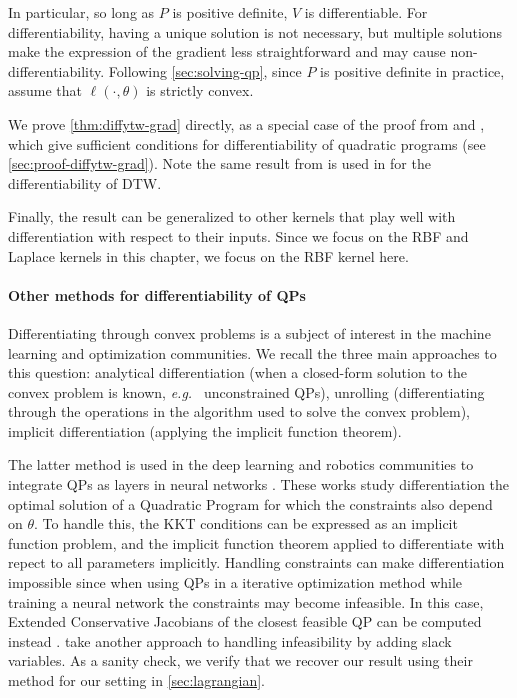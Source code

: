 In particular, so long as $P$ is positive definite, $V$ is differentiable. For differentiability, having a unique solution is not necessary, but multiple solutions make the expression of the gradient less straightforward and may cause non-differentiability. Following \cref{sec:solving-qp}, since $P$ is positive definite in practice, assume that $\ell(\cdot, \theta)$ is strictly convex.

We prove \cref{thm:diffytw-grad} directly, as a special case of the proof from \cite{shapiro} and \cite{lee}, which give sufficient conditions for differentiability of quadratic programs (see \cref{sec:proof-diffytw-grad}). Note the same result from \citep{shapiro} is used in \cite{tavenard-dtw-diff} for the differentiability of DTW.

Finally, the result can be generalized to other kernels that play well with differentiation with respect to their inputs. Since we focus on the RBF and Laplace kernels in this chapter, we focus on the RBF kernel here.

\paragraph{Other methods for differentiability of QPs}
Differentiating through convex problems is a subject of interest in the machine learning and optimization communities. We recall the three main approaches to this question: analytical differentiation (when a closed-form solution to the convex problem is known, \emph{e.g.\ } unconstrained QPs), unrolling (differentiating through the operations in the algorithm used to solve the convex problem), implicit differentiation (applying the implicit function theorem).

The latter method is used in the deep learning and robotics communities to integrate QPs as layers in neural networks \citep{QP-Layer,optnet}. These works study differentiation the optimal solution of a Quadratic Program for which the constraints also depend on $\theta$. To handle this, the KKT conditions can be expressed as an implicit function problem, and the implicit function theorem applied to differentiate with repect to all parameters implicitly. Handling constraints can make differentiation impossible since when using QPs in a iterative optimization method while training a neural network the constraints may become infeasible. In this case, Extended Conservative Jacobians of the closest feasible QP can be computed instead \citep{QP-Layer}. \citet{optnet} take another approach to handling infeasibility by adding slack variables. As a sanity check, we verify that we recover our result using their method for our setting in \cref{sec:lagrangian}.

